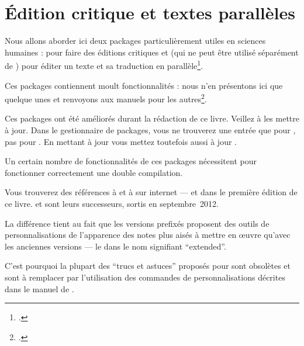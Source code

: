 \chapter{Édition critique et textes parallèles}  \label{eledmac}


\begin{intro}
Nous allons aborder ici deux packages particulièrement utiles en sciences humaines :  pour faire des éditions critiques et  (qui ne peut être utilisé séparément de ) pour éditer un texte et sa traduction en parallèle\footcite[Il existe un livre d'introduction aux éditions critiques avec \XeLaTeX :][]{leal2012}.

Ces packages contiennent moult fonctionnalités : nous n'en présentons ici que quelque unes et renvoyons aux manuels pour les autres\footcites{eledmac}{eledpar}. 
\end{intro}

\begin{attention}
Ces packages ont été améliorés durant la rédaction de ce livre. Veillez à les mettre à jour.
Dans le gestionnaire de packages, vous ne trouverez une entrée que pour  ,  pas pour .  En mettant à jour  vous mettez toutefois aussi à jour  .
\end{attention}

\begin{attention}
Un certain nombre de fonctionnalités de ces packages nécessitent pour fonctionner correctement une double compilation.
\end{attention}

\begin{plusloins}
Vous trouverez des références à  et à  sur internet --- et dans le première édition de ce livre.
 et  sont leurs successeurs, sortis en septembre~2012.

La différence tient au fait que les versions prefixés proposent des outils de personnalisations de l'apparence des notes plus aisés à mettre en œuvre qu'avec les anciennes versions --- le  dans le nom signifiant \enquote{\textenglish{extended}}. 

C'est pourquoi la plupart des \enquote{trucs et astuces} proposés pour  sont obsolètes et sont à remplacer par l'utilisation des commandes de personnalisations décrites dans le manuel de .
\end{plusloins}

